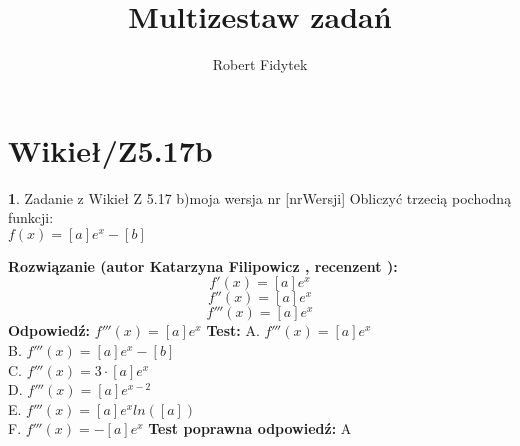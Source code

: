 \documentclass[12pt, a4paper]{article}
\title{Multizestaw zadań}
\author{Robert Fidytek}
\date{}
\theoremstyle{definition} %
\newtheorem{zad}{}
\newcommand{\kategoria}[1]{\section{#1}} %
\newcommand{\zadStart}[1]{\begin{zad}#1\newline} %
\newcommand{\zadStop}{\end{zad}}   %
\newcommand{\rozwStart}[2]{\noindent \textbf{Rozwiązanie (autor #1 , recenzent #2): }\newline} %
\newcommand{\rozwStop}{\newline}                                            %
\newcommand{\odpStart}{\noindent \textbf{Odpowiedź:}\newline}    %
\newcommand{\odpStop}{\newline}                                             %
\newcommand{\testStart}{\noindent \textbf{Test:}\newline} %
\newcommand{\testStop}{\newline} %
\newcommand{\kluczStart}{\noindent \textbf{Test poprawna odpowiedź:}\newline} %
\newcommand{\kluczStop}{\newline} %
\begin{document}
\maketitle


\kategoria{Wikieł/Z5.17b}
\zadStart{Zadanie z Wikieł Z 5.17 b)moja wersja nr [nrWersji]}
Obliczyć trzecią pochodną funkcji:\\
$f(x)=[a]e^x-[b]$
\zadStop
\rozwStart{Katarzyna Filipowicz}{}
$$
f'(x)=[a]e^x
$$ $$
f''(x)=[a]e^x
$$ $$
f'''(x)=[a]e^x
$$
\rozwStop
\odpStart
$f'''(x)=[a]e^x$
\odpStop
\testStart
A. $f'''(x)=[a]e^x$\\
B. $f'''(x)=[a]e^x-[b]$\\
C. $f'''(x)=3\cdot [a]e^x$\\
D. $f'''(x)=[a]e^{x-2}$\\
E. $f'''(x)=[a]e^xln([a])$\\
F. $f'''(x)=-[a]e^x$
\testStop
\kluczStart
A
\kluczStop
\end{document}
